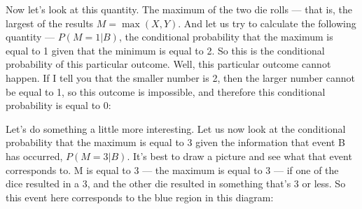 \documentclass[pdftex, brazil, 12pt, twoside]{article}
\begin{document}
Now let's look at this quantity.
The maximum of the two die rolls ---
that is, the largest of the results $M = \max(X, Y)$.
And let us try to calculate the following quantity ---
$P(M=1|B)$, the conditional probability that the maximum is equal to 1
given that the minimum is equal to 2.
So this is the conditional probability of
this particular outcome.
Well, this particular outcome cannot happen.
If I tell you that the smaller number is 2, then the larger
number cannot be equal to 1, so this outcome is impossible,
and therefore this conditional probability is equal to 0:

\begin{figure}[H]
  \begin{center}
  \end{center}
\end{figure}

Let's do something a little more interesting.
Let us now look at the conditional probability that
the maximum is equal to 3 given the information that
event B has occurred, $P(M=3|B)$.
It's best to draw a picture and see what that event
corresponds to.
M is equal to 3 ---
the maximum is equal to 3 ---
if one of the dice resulted in a 3, and the other die
resulted in something that's 3 or less.
So this event here corresponds to the blue
region in this diagram:

\begin{figure}[H]
  \begin{center}
  \end{center}
\end{figure}
\end{document}
